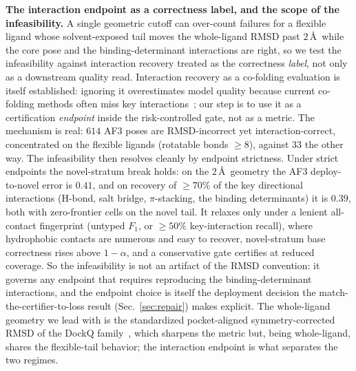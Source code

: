 \documentclass[10pt]{article}
\begin{document}
\textbf{The interaction endpoint as a correctness label, and the scope of the infeasibility.} A single
geometric cutoff can over-count failures for a flexible ligand whose solvent-exposed tail moves the
whole-ligand RMSD past $2$\,\AA\ while the core pose and the binding-determinant interactions are right, so
we test the infeasibility against interaction recovery treated as the correctness \emph{label}, not only as
a downstream quality read. Interaction recovery as a co-folding evaluation is itself established: ignoring it
overestimates model quality because current co-folding methods often miss key interactions~\citep{errington2025};
our step is to use it as a certification \emph{endpoint} inside the risk-controlled gate, not as a metric. The mechanism is real: $614$ AF3 poses are RMSD-incorrect yet
interaction-correct, concentrated on the flexible ligands (rotatable bonds $\ge 8$), against $33$ the other
way. The infeasibility then resolves cleanly by endpoint strictness. Under strict endpoints the novel-stratum break holds: on the $2$\,\AA\ geometry the AF3
deploy-to-novel error is $0.41$, and on recovery of $\ge 70\%$ of the key directional interactions (H-bond,
salt bridge, $\pi$-stacking, the binding determinants) it is $0.39$, both with zero-frontier cells on the
novel tail. It relaxes only under a lenient all-contact fingerprint (untyped $F_1$, or $\ge 50\%$
key-interaction recall), where hydrophobic contacts are numerous and easy to recover, novel-stratum base
correctness rises above $1-\alpha$, and a conservative gate certifies at reduced coverage. So the
infeasibility is not an artifact of the RMSD convention: it governs any endpoint that requires reproducing
the binding-determinant interactions, and the endpoint choice is itself the deployment decision the
match-the-certifier-to-loss result (Sec.~\ref{sec:repair}) makes explicit. The whole-ligand geometry we
lead with is the standardized pocket-aligned symmetry-corrected RMSD of the DockQ family~\citep{dockq2},
which sharpens the metric but, being whole-ligand, shares the flexible-tail behavior; the interaction
endpoint is what separates the two regimes.
\end{document}
